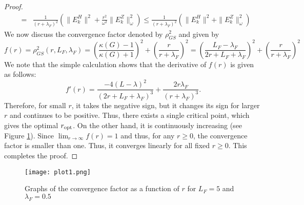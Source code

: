 \begin{proof}
\begin{eqnarray*}
&=& \frac{1}{(r + \lambda_F)^2} \left ( \|E_k^H\|^2 + \frac{r^2}{\omega^2} \|E_k^Z\|_\omega ^2 \right ) \leq \frac{1}{(r + \lambda_F)^2} \left ( \|E_k^H\|^2 + \|E_k^Z\|_\omega ^2 \right ) 
\end{eqnarray*}
We now discuss the convergence factor denoted by $\rho_{GS}^2$ and given by 
\begin{equation}
f(r) = \rho^2_{GS}(r, L_F, \lambda_F) = \left ( \frac{\kappa(G) - 1}{\kappa(G) + 1} \right )^2 + \left ( \frac{r}{r+\lambda_F} \right )^2 = \left ( \frac{L_F - \lambda_F}{2r + L_F + \lambda_F} \right )^2 + \left ( \frac{r}{r+\lambda_F} \right )^2 
\end{equation}
We note that the simple calculation shows that the derivative of $f(r)$ is given as follows: 
\begin{equation}
f'(r) = \frac{-4(L-\lambda)^2}{(2r + L_F + \lambda_F)^3} + \frac{2r \lambda_F}{(r + \lambda_F)^3}. 
\end{equation}
Therefore, for small $r$, it takes the negative sign, but it changes its sign for larger $r$ and continues to be positive. Thus, there exists a single critical point, which gives the optimal $r_{\rm opt}$. On the other hand, it is continuously increasing (see Figure \ref{exam}). Since $\lim_{r \rightarrow \infty} f(r) = 1$ and thus, for any $r \geq 0$, the convergence factor is smaller than one. Thus, it converges linearly for all fixed $r \geq 0$. This completes the proof.
\end{proof} 
\begin{figure}[h]
\centering
\texttt{[image: plot1.png]}
\caption{Graphs of the convergence factor as a function of $r$ for $L_F = 5$ and $\lambda_F = 0.5$}\label{exam} 
\end{figure}
